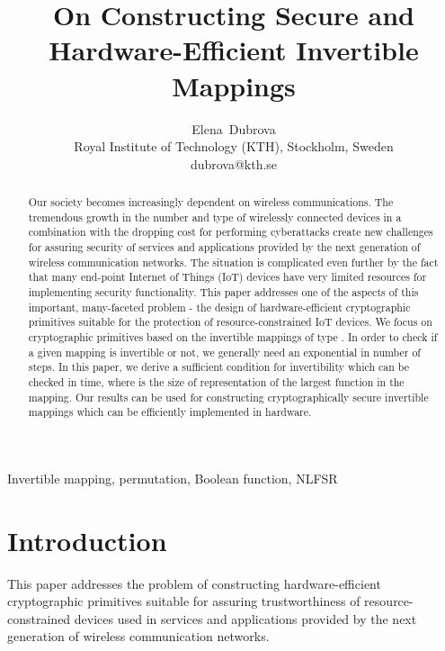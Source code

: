 \documentclass[9pt,conference]{IEEEtran} \usepackage{times}
\begin{document}
\title{On Constructing Secure and Hardware-Efficient Invertible Mappings}
\author{
Elena~Dubrova  \\
Royal Institute of Technology (KTH), Stockholm, Sweden \\ 
dubrova@kth.se
}

\maketitle
 
\begin{abstract}
Our society becomes increasingly dependent on wireless communications. The tremendous growth in the number and type of wirelessly connected devices in a combination with the dropping cost for performing cyberattacks create new challenges for assuring security of services and applications provided by the next generation of wireless communication networks. The situation is complicated even further by the fact that many end-point Internet of Things (IoT) devices have very limited resources for implementing security functionality. This paper addresses one of the aspects of this important, many-faceted problem - the design of hardware-efficient cryptographic primitives suitable for the protection of resource-constrained IoT devices. We focus on cryptographic primitives based on the invertible mappings of type .
In order to check if a given mapping is invertible or not, we generally need an exponential in  number of steps.
In this paper, we derive a sufficient condition for invertibility which can be checked in  time, where  is the size of representation of the largest function in the mapping. Our results can be used for constructing cryptographically secure invertible mappings which can be efficiently implemented in hardware.
\end{abstract}

\begin{keywords} 
Invertible mapping, permutation, Boolean function, NLFSR
\end{keywords}


\section{Introduction}

This paper addresses the problem of constructing hardware-efficient cryptographic primitives 
suitable for assuring trustworthiness of resource-constrained devices used in services and applications provided by the next generation of wireless communication networks.
 
\end{document}
